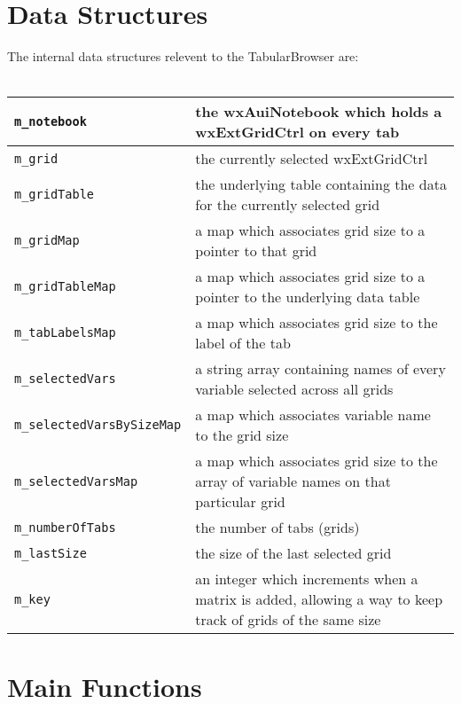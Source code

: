 \documentclass[11pt]{article} %
\begin{document}
\section{Data Structures}
The internal data structures relevent to the TabularBrowser are: \\
\\
\begin{tabular}{l | p{11cm} }
\hline
\texttt{m\_notebook} & the wxAuiNotebook which holds a wxExtGridCtrl on every tab \\ \hline
\texttt{m\_grid} & the currently selected wxExtGridCtrl \\ \hline
\texttt{m\_gridTable} & the underlying table containing the data for the currently selected grid \\ \hline
\texttt{m\_gridMap} & a map which associates grid size to a pointer to that grid \\ \hline
\texttt{m\_gridTableMap} & a map which associates grid size to a pointer to the underlying data table \\ \hline
\texttt{m\_tabLabelsMap} & a map which associates grid size to the label of the tab \\ \hline
\texttt{m\_selectedVars} & a string array containing names of every variable selected across all grids \\ \hline
\texttt{m\_selectedVarsBySizeMap} & a map which associates variable name to the grid size \\ \hline
\texttt{m\_selectedVarsMap} & a map which associates grid size to the array of variable names on that particular grid \\ \hline
\texttt{m\_numberOfTabs} & the number of tabs (grids) \\ \hline
\texttt{m\_lastSize} & the size of the last selected grid \\ \hline
\texttt{m\_key} & an integer which increments when a matrix is added, allowing a way to keep track of grids of the same size \\ 
\hline
\end{tabular}

\section{Main Functions}
\end{document}
